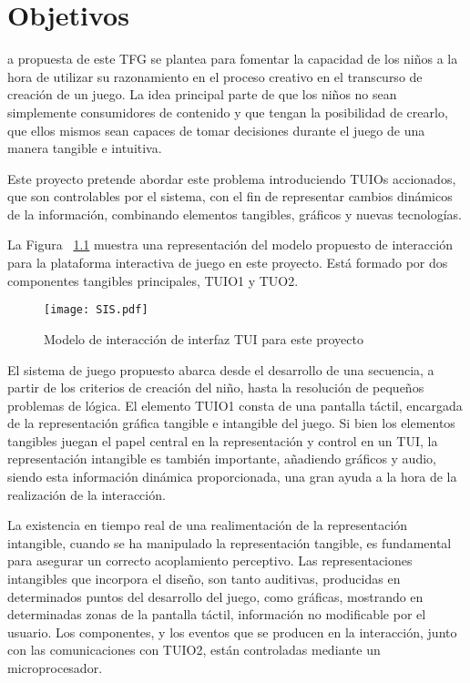 \chapter{Objetivos}
\label{chap:objetivos}

\noindent
{}a propuesta de este TFG se plantea para fomentar la capacidad de los niños a la hora de utilizar su
razonamiento en el proceso creativo en el transcurso de creación de un juego. La idea principal parte de que los niños no sean simplemente consumidores de contenido y que tengan la posibilidad de crearlo, que ellos mismos sean capaces de tomar decisiones durante el juego de una manera tangible e intuitiva. 

Este proyecto pretende abordar este problema introduciendo TUIOs accionados, que son controlables por el sistema, con el fin de representar cambios dinámicos de la información, combinando elementos tangibles, gráficos y nuevas tecnologías.

La Figura ~\ref{fig:SIS} muestra una representación del modelo propuesto de interacción para la plataforma interactiva de juego en este proyecto. Está formado por dos componentes tangibles principales, TUIO1 y TUO2.

\begin{figure}[!h]
\begin{center}
\texttt{[image: SIS.pdf]}
\caption{Modelo de interacción de interfaz TUI para este proyecto}
\label{fig:SIS}
\end{center}
\end{figure}

El sistema de juego propuesto abarca desde el desarrollo de una secuencia, a partir de los criterios de creación del niño, hasta la resolución de pequeños problemas de lógica. El elemento TUIO1 consta de una pantalla táctil, encargada de la representación gráfica tangible e intangible del juego. Si bien los elementos tangibles juegan el papel central en la representación y control en un TUI, la representación intangible es también importante, añadiendo gráficos y audio, siendo esta información dinámica proporcionada, una gran ayuda a la hora de la realización de la interacción. 

La existencia en tiempo real de una realimentación de la representación intangible, cuando se ha manipulado la representación tangible, es fundamental para asegurar un correcto acoplamiento perceptivo. Las representaciones intangibles que incorpora el diseño, son tanto auditivas, producidas en determinados puntos del desarrollo del juego, como gráficas, mostrando en determinadas zonas de la pantalla táctil, información no modificable por el usuario.
Los componentes, y los eventos que se producen en la interacción, junto con las comunicaciones con TUIO2, están controladas mediante un microprocesador.


